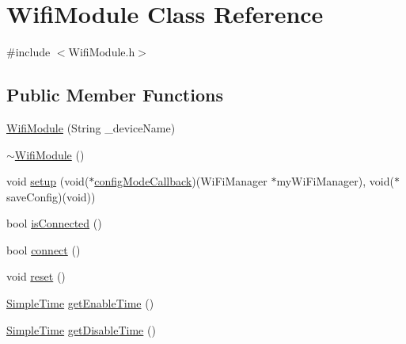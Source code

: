 \hypertarget{class_wifi_module}{}\section{Wifi\+Module Class Reference}
\label{class_wifi_module}


{\ttfamily \#include $<$Wifi\+Module.\+h$>$}

\subsection*{Public Member Functions}
\begin{DoxyCompactItemize}
\item 
\mbox{\hyperlink{class_wifi_module_a1fad662191ce40056868f0a21d0b1ef0}{Wifi\+Module}} (String \+\_\+device\+Name)
\item 
\mbox{\hyperlink{class_wifi_module_a13508027d6d44f9ad4adc916a142c4e4}{$\sim$\+Wifi\+Module}} ()
\item 
void \mbox{\hyperlink{class_wifi_module_a78a8fa5090dc159e070d32c957e661dd}{setup}} (void($\ast$\mbox{\hyperlink{main_8cpp_a4aad99c28e20c1b4f8b50e262930e1e5}{config\+Mode\+Callback}})(Wi\+Fi\+Manager $\ast$my\+Wi\+Fi\+Manager), void($\ast$save\+Config)(void))
\item 
bool \mbox{\hyperlink{class_wifi_module_a0f9b83f8ed9714183df33e055323261f}{is\+Connected}} ()
\item 
bool \mbox{\hyperlink{class_wifi_module_a408a6374602360051d2791de4f56b067}{connect}} ()
\item 
void \mbox{\hyperlink{class_wifi_module_af03089b54800669d9cc57d3ac8bf3188}{reset}} ()
\item 
\mbox{\hyperlink{class_simple_time}{Simple\+Time}} \mbox{\hyperlink{class_wifi_module_a1082a8799fe84e825520a61ee048da46}{get\+Enable\+Time}} ()
\item 
\mbox{\hyperlink{class_simple_time}{Simple\+Time}} \mbox{\hyperlink{class_wifi_module_ae43e1f85630c40920fa87c12de0d8e1e}{get\+Disable\+Time}} ()
\end{DoxyCompactItemize}
